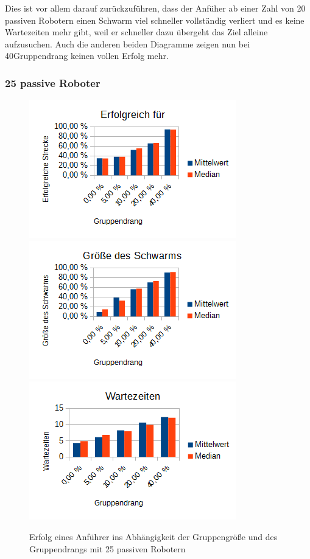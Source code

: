 Dies ist vor allem darauf zurückzuführen, dass der Anfüher ab einer Zahl von 20 passiven Robotern einen Schwarm viel schneller vollständig verliert und es keine Wartezeiten mehr gibt, weil er schneller dazu übergeht das Ziel alleine aufzusuchen. Auch die anderen beiden Diagramme zeigen nun bei 40\per Gruppendrang keinen vollen Erfolg mehr.

\subsubsection*{25 passive Roboter}

\begin{figure}[h]
	\includegraphics[width=\sectionLeaderPictureWidth , height=\sectionLeaderPictureHeight]{graphics/Statistics/Leader/FlockSize/25_1.png}
	\includegraphics[width=\sectionLeaderPictureWidth , height=\sectionLeaderPictureHeight]{graphics/Statistics/Leader/FlockSize/25_2.png}
	\includegraphics[width=\sectionLeaderPictureWidth , height=\sectionLeaderPictureHeight]{graphics/Statistics/Leader/FlockSize/25_3.png}
	\caption{Erfolg eines Anführer ins Abhängigkeit der Gruppengröße und des Gruppendrangs mit 25 passiven Robotern}
	\label{pic:LeaderSize25}
\end{figure}


